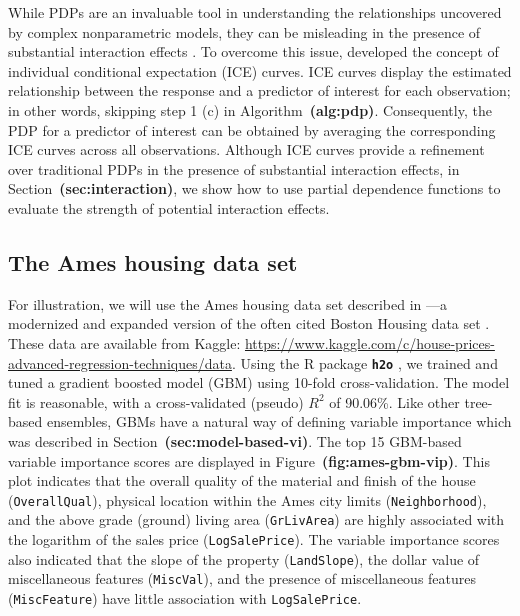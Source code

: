 \documentclass[12pt]{article}
\newcommand{\pkg}[1]{\texorpdfstring%
{{\normalfont\fontseries{b}\selectfont #1}}%
{#1}}
\def\code#1{\texttt{#1}}
\def\pkg#1{\textbf{\texttt{#1}}}
\def\ref#1{\textbf{(#1)}}
\begin{document}
While PDPs are an invaluable tool in understanding the relationships uncovered by complex nonparametric models, they can be misleading in the presence of substantial interaction effects \citep{goldstein-peeking-2015}. To overcome this issue, \citeauthor{goldstein-peeking-2015} developed the concept of individual conditional expectation (ICE) curves. ICE curves display the estimated relationship between the response and a predictor of interest for each observation; in other words, skipping step 1 (c) in Algorithm~\ref{alg:pdp}. Consequently, the PDP for a predictor of interest can be obtained by averaging the corresponding ICE curves across all observations. Although ICE curves provide a refinement over traditional PDPs in the presence of substantial interaction effects, in Section~\ref{sec:interaction}, we show how to use partial dependence functions to evaluate the strength of potential interaction effects.


\subsection{The Ames housing data set}
\label{sec:ames}

For illustration, we will use the Ames housing data set described in \citep{ames-cock-2011}---a modernized and expanded version of the often cited Boston Housing data set \citep{harrison-1978-hedonic}. These data are available from Kaggle: \url{https://www.kaggle.com/c/house-prices-advanced-regression-techniques/data}. Using the R package \pkg{h2o} \citep{h2o-pkg}, we trained and tuned a gradient boosted model (GBM) \citep{friedman-2001-greedy} using 10-fold cross-validation. The model fit is reasonable, with a cross-validated (pseudo) $R^2$ of 90.06\%. Like other tree-based ensembles, GBMs have a natural way of defining variable importance which was described in Section~\ref{sec:model-based-vi}. The top 15 GBM-based variable importance scores are displayed in Figure~\ref{fig:ames-gbm-vip}. This plot indicates that the overall quality of the material and finish of the house (\code{OverallQual}), physical location within the Ames city limits (\code{Neighborhood}), and the above grade (ground) living area (\code{GrLivArea}) are highly associated with the logarithm of the sales price (\code{LogSalePrice}). The variable importance scores also indicated that the slope of the property (\code{LandSlope}), the dollar value of miscellaneous features (\code{MiscVal}), and the presence of miscellaneous features (\code{MiscFeature})  have little association with \code{LogSalePrice}.
\end{document}
